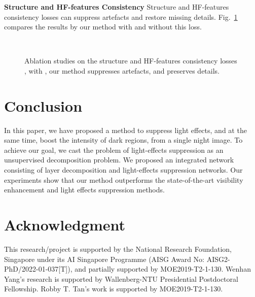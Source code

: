 \documentclass[runningheads]{llncs}
\begin{document}
\noindent \textbf{Structure and HF-features Consistency}
Structure and HF-features consistency losses can suppress artefacts and restore missing details.  
Fig.~\ref{fig_ab_gray} compares the results by our method with and without this loss.

\begin{figure}[t!]
	\captionsetup[subfloat]{labelformat=empty}
	\captionsetup[subfloat]{farskip=1pt}
\hfill
	\hfill	
	\hfill
	\hfill
	\hfill
	\hfill\\
	\caption{Ablation studies on the structure and HF-features consistency losses , with , our method suppresses artefacts, and preserves details.}
\label{fig_ab_gray}
\end{figure} 

\section{Conclusion}
\label{sec:conclusion}
In this paper, we have proposed a method to suppress light effects, and at the same time, boost the intensity of dark regions, from a single night image.
To achieve our goal, we cast the problem of light-effects suppression as an unsupervised decomposition problem.
We proposed an integrated network consisting of layer decomposition and light-effects suppression networks.
Our experiments show that our method outperforms the state-of-the-art visibility enhancement and light effects suppression methods. 

\section*{Acknowledgment}
This research/project is supported by the National Research Foundation, Singapore under its AI Singapore Programme (AISG Award No: AISG2-PhD/2022-01-037[T]), and partially supported by MOE2019-T2-1-130.
Wenhan Yang's research is supported by Wallenberg-NTU Presidential Postdoctoral Fellowship.	
Robby T. Tan's work is supported by MOE2019-T2-1-130.

\clearpage


\end{document}
